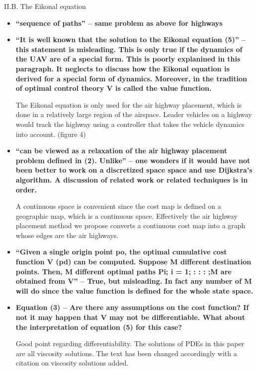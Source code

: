 \documentclass[submit]{aiaa-pretty}
\begin{document}
II.B. The Eikonal equation
\begin{itemize}
\item \textbf{``sequence of paths'' – same problem as above for highways}
\item \textbf{``It is well known that the solution to the Eikonal equation (5)'' – this statement is misleading. This is only true if the dynamics of the UAV are of a special form. This is poorly explanined in this paragraph. It neglects to discuss how the Eikonal equation is derived for a special form of dynamics. Moreover, in the tradition of optimal control theory V is called the value function.}

The Eikonal equation is only used for the air highway placement, which is done in a relatively large region of the airspace. Leader vehicles on a highway would track the highway using a controller that takes the vehicle dynamics into account. (figure 4)

\item \textbf{``can be viewed as a relaxation of the air highway placement problem defined in (2). Unlike'' – one wonders if it would have not been better to work on a discretized space space and use Dijkstra’s algorithm. A discussion of related work or related techniques is in order.}

A continuous space is convenient since the cost map is defined on a geographic map, which is a continuous space. Effectively the air highway placement method we propose converts a continuous cost map into a graph whose edges are the air highways.

\item \textbf{``Given a single origin point po, the optimal cumulative cost function V (pd) can be computed. Suppose M different destination points. Then, M different optimal paths Pi; i = 1; : : : ;M are obtained from V'' – True, but misleading. In fact any number of M will do since the value function is defined for the whole state space.}
\item \textbf{ Equation (3) – Are there any assumptions on the cost function? If not it may happen that V may not be differentiable. What about the interpretation of equation (5) for this case?}

Good point regarding differentiability. The solutions of PDEs in this paper are all viscosity solutions. The text has been changed accordingly with a citation on viscosity solutions added.
\end{itemize}
\end{document}
